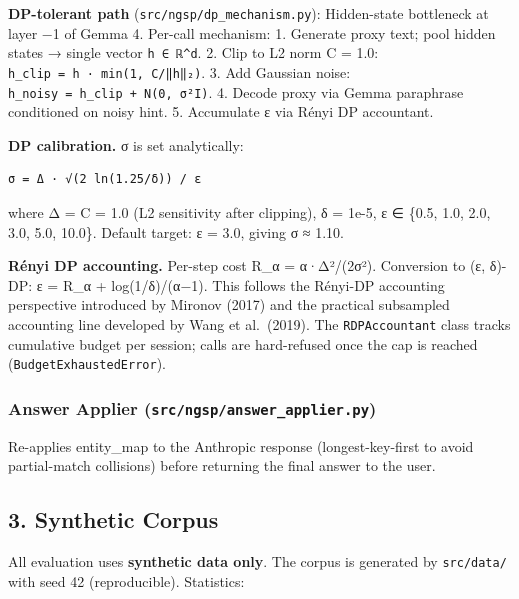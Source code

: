\textbf{DP-tolerant path} (\texttt{src/ngsp/dp\_mechanism.py}):
Hidden-state bottleneck at layer −1 of Gemma 4. Per-call mechanism: 1.
Generate proxy text; pool hidden states → single vector
\texttt{h\ ∈\ ℝ\^{}d}. 2. Clip to L2 norm C = 1.0:
\texttt{h\_clip\ =\ h\ ·\ min(1,\ C/‖h‖₂)}. 3. Add Gaussian noise:
\texttt{h\_noisy\ =\ h\_clip\ +\ N(0,\ σ²I)}. 4. Decode proxy via Gemma
paraphrase conditioned on noisy hint. 5. Accumulate ε via Rényi DP
accountant.

\textbf{DP calibration.} σ is set analytically:

\begin{verbatim}
σ = Δ · √(2 ln(1.25/δ)) / ε
\end{verbatim}

where Δ = C = 1.0 (L2 sensitivity after clipping), δ = 1e-5, ε ∈ \{0.5,
1.0, 2.0, 3.0, 5.0, 10.0\}. Default target: ε = 3.0, giving σ ≈ 1.10.

\textbf{Rényi DP accounting.} Per-step cost R\_α = α·Δ²/(2σ²).
Conversion to (ε, δ)-DP: ε = R\_α + log(1/δ)/(α−1). This follows the
Rényi-DP accounting perspective introduced by Mironov (2017) and the
practical subsampled accounting line developed by Wang et al.~(2019).
The \texttt{RDPAccountant} class tracks cumulative budget per session;
calls are hard-refused once the cap is reached
(\texttt{BudgetExhaustedError}).

\subsubsection{\texorpdfstring{Answer Applier
(\texttt{src/ngsp/answer\_applier.py})}{Answer Applier (src/ngsp/answer\_applier.py)}}\label{answer-applier-srcngspanswer_applier.py}

Re-applies entity\_map to the Anthropic response (longest-key-first to
avoid partial-match collisions) before returning the final answer to the
user.

\subsection{3. Synthetic Corpus}\label{synthetic-corpus}

All evaluation uses \textbf{synthetic data only}. The corpus is
generated by \texttt{src/data/} with seed 42 (reproducible). Statistics:

